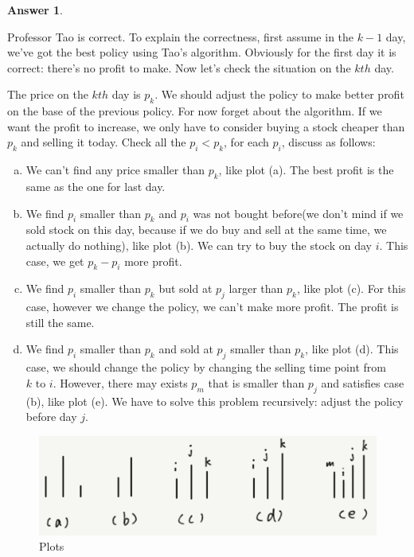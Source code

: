 \documentclass{article}
\theoremstyle{definition}
\newtheorem{ans}{Answer}
\begin{document}
	\begin{ans}
		~
		
		Professor Tao is correct. To explain the correctness, first assume in the $k-1$ day, we've got the best policy using Tao's algorithm. Obviously for the first day it is correct: there's no profit to make. Now let's check the situation on the $kth$ day. 
		
		The price on the $kth$ day is $p_k$. We should adjust the policy to make better profit on the base of the previous policy. For now forget about the algorithm. If we want the profit to increase, we only have to consider buying a stock cheaper than $p_k$ and selling it today. Check all the $p_i<p_k$, for each $p_i$,  discuss as follows:
	
		\begin{enumerate}[(a)]
			\item We can't find any price smaller than $p_k$, like plot (a). The best profit is the same as the one for last day. 
			\item We find $p_i$ smaller than $p_k$ and $p_i$ was not bought before(we don't mind if we sold stock on this day, because if we do buy and sell at the same time, we actually do nothing), like plot (b). We can try to buy the stock on day $i$. This case, we get $p_k-p_i$ more profit. 
			\item We find $p_i$ smaller than $p_k$ but sold at $p_j$ larger than $p_k$, like plot (c). For this case, however we change the policy, we can't make more profit. The profit is still the same. 
			\item We find $p_i$ smaller than $p_k$ and sold at $p_j$ smaller than $p_k$, like plot (d). This case, we should change the policy by changing the selling time point from $k\text{ to }i$. However, there may exists $p_m$ that is smaller than $p_j$ and satisfies case (b), like plot (e). We have to solve this problem recursively: adjust the policy before day $j$. 
		\end{enumerate}
	
		\begin{figure}
			\centering
			\includegraphics[width=0.7\linewidth]{plot}
			\caption{Plots}
			\label{fig:plot}
		\end{figure}
		

\end{ans}
\end{document}
